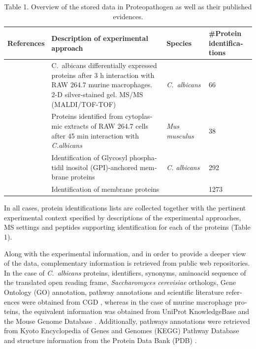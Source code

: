 \begin{otherlanguage}{british}
\begin{table}[t]

\caption*{Table 1. Overview of the stored data in Proteopathogen as well as their published evidences.}

\renewcommand{\arraystretch}{2}
\footnotesize
\centering

\begin{tabular}{p{3cm} p{4cm} l p{2cm} }

\hline
References & Description of  \newline{} experimental approach & Species & \#Protein \newline{} identifications \\
\hline
\

\citep{Fernandez-Arenas2007} & \mbox{C. albicans} differentially expressed proteins after 3 h interaction with RAW 264.7 murine macrophages. 2-D silver-stained gel. MS/MS (MALDI/TOF-TOF) & \textit{\mbox{C. albicans}} & 66\\

\citep{Martinez-Solano2006a} & Proteins identified from cytoplasmic extracts of RAW 264.7 cells after 45 min interaction with \textit{C.albicans} & \textit{Mus musculus} & 38\\

\citep{Cabezon2009} & Identification of Glycosyl phosphatidil inositol (GPI)-anchored membrane proteins & \textit{C. albicans} & 292\\

 & Identification of membrane proteins &  & 1273\\

\end{tabular}
\end{table}



In all cases, protein identifications lists are collected
together with the pertinent experimental context specified
by descriptions of the experimental approaches, MS settings
and peptides supporting identification for each of the
proteins (Table 1).

Along with the experimental information, and in order to
provide a deeper view of the data, complementary information
 is retrieved from public web repositories. In the
case of \textit{\mbox{C. albicans}} proteins, identifiers, synonyms, aminoacid
sequence of the translated open reading frame, \textit{Saccharomyces
cerevisiae} orthologs, Gene Ontology (GO) annotation, pathway
annotations and scientific literature references were obtained
from CGD \citep{Arnaud2005}, whereas in the case of murine macrophage
proteins, the equivalent information was obtained from
UniProt KnowledgeBase \citep{Uniprot2008} and the Mouse Genome Database
 \citep{Bult2008}. Additionally, pathways annotations were retrieved
from Kyoto Encyclopedia of Genes and Genomes (KEGG)
Pathway Database \citep{Kanehisa2007} and structure information from the
Protein Data Bank (PDB) \citep{Berman2000}.


\end{otherlanguage}
